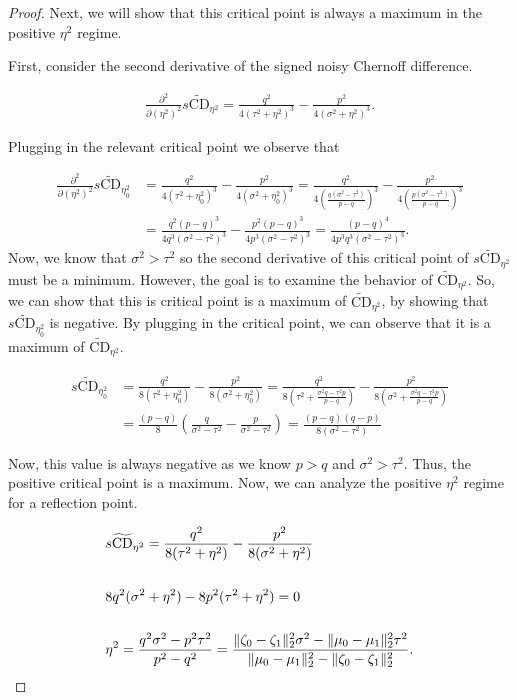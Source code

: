 \documentclass[11pt,letterpaper]{article}
\begin{document}
\begin{proof}
Next, we will show that this critical point is always a maximum in the positive $\eta^2$ regime.

First, consider the second derivative of the signed noisy Chernoff difference.

\begin{align}
    \frac{\partial^2}{\partial (\eta^2)^2}s\widetilde{\text{CD}}_{\eta^2} =  \frac{q^2}{4(\tau^2 + \eta^2)^3} - \frac{p^2}{4(\sigma^2 + \eta^2)^3}.
\end{align}

Plugging in the relevant critical point we observe that

\begin{align}
    \frac{\partial^2}{\partial (\eta^2)^2 }s  \widetilde{\text{CD}}_{\eta_0^2} &=  \frac{q^2}{4(\tau^2 + \eta_0^2)^3} - \frac{p^2}{4(\sigma^2 + \eta_0^2)^3} = \frac{q^2}{4(\frac{q(\sigma^2-\tau^2)}{p-q})^3} -  \frac{p^2}{4(\frac{p(\sigma^2-\tau^2)}{p-q})^3} \\&=  \frac{q^2(p-q)^3}{4q^3(\sigma^2-\tau^2)^3} - \frac{p^2(p-q)^3}{4p^3(\sigma^2-\tau^2)^3} = \frac{(p-q)^4}{4p^3q^3(\sigma^2-\tau^2)^3}.
\end{align}
Now, we know that $\sigma^2 > \tau^2$ so the second derivative of  this critical point of $s\widetilde{\text{CD}}_{\eta^2}$ must be a minimum. However, the goal is to examine the behavior of $\widetilde{\text{CD}}_{\eta^2}$. So, we can show that this is critical point is a maximum of $\widetilde{\text{CD}}_{\eta^2}$, by showing that $s\widetilde{\text{CD}}_{\eta_0^2}$ is negative. By plugging in the critical point, we can observe that it is a maximum of $\widetilde{\text{CD}}_{\eta^2}$.

\begin{align}
    s\widetilde{\text{CD}}_{\eta_0^2} &= \frac{q^2}{8(\tau^2 + \eta_0^2)} - \frac{p^2}{8(\sigma^2 + \eta_0^2)} = \frac{q^2}{8(\tau^2 + \frac{\sigma^2q-\tau^2p}{p-q})} - \frac{p^2}{8(\sigma^2 + \frac{\sigma^2q-\tau^2p}{p-q})} \\&= \frac{(p-q)}{8}(\frac{q}{\sigma^2-\tau^2}-\frac{p}{\sigma^2-\tau^2}) = \frac{(p-q)(q-p)}{8(\sigma^2 - \tau^2)}
\end{align}


Now, this value is always negative as we know $p > q$ and $\sigma^2 > \tau^2$. Thus, the positive critical point is a maximum. Now, we can analyze the positive $\eta^2$ regime for a reflection point. 

\begin{align}
    &s\widetilde{\text{CD}}_{\eta^2} = \frac{q^2}{8(\tau^2 + \eta^2)} - \frac{p^2}{8(\sigma^2 + \eta^2)} \\ \notag
    \\
    &8q^2(\sigma^2 + \eta^2) - 8p^2(\tau^2 + \eta^2) = 0 \\ \notag
    \\
    &\eta^2 = \frac{q^2\sigma^2-p^2\tau^2}{p^2-q^2} = \frac{\|\zeta_0 - \zeta_1\|_2^2\sigma^2-\|\mu_0 - \mu_1\|_2^2\tau^2}{\|\mu_0 - \mu_1\|_2^2-\|\zeta_0 - \zeta_1\|_2^2}.
\end{align}






\end{proof}
\end{document}
